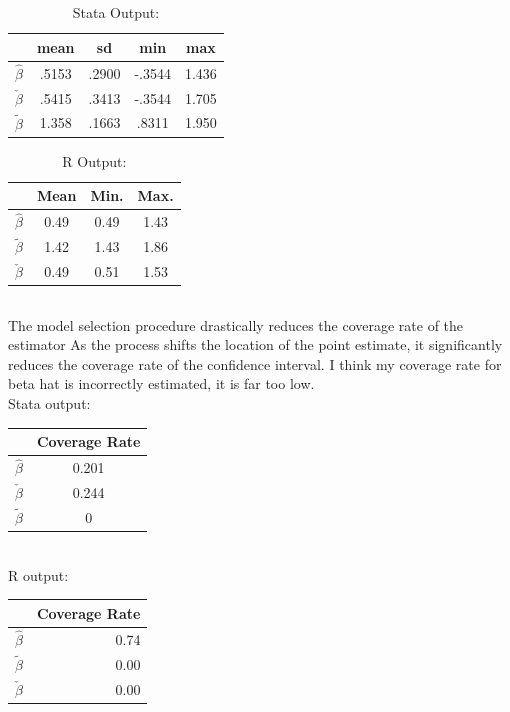 \documentclass[12pt]{article}
\begin{document}
\begin{table}[ht]
  \caption {Stata Output:} \label{tab:title}
\centering
\begin{tabular}{lcccc}
  \hline
&        mean&          sd&         min&         max\\
\hline
$\hat\beta$    &    .5153&    .2900&   -.3544&    1.436\\
$\check\beta$   &    .5415&    .3413&   -.3544&    1.705\\
$\tilde\beta$    &    1.358&    .1663&    .8311&    1.950\\
\hline
\end{tabular}
\end{table}

\par
\begin{table}[ht]
  \caption {R Output:} \label{tab:title}
\centering
\begin{tabular}{lccc}
  \hline
 & Mean & Min. & Max. \\
  \hline
$\hat\beta$   & 0.49 & 0.49 &  1.43 \\
  $\tilde\beta$   & 1.42 & 1.43 & 1.86 \\
 $\check\beta$  & 0.49 & 0.51 & 1.53 \\
   \hline
\end{tabular}
\end{table}

\subsection{}

The model selection procedure drastically reduces the coverage rate of the estimator As the process shifts the location of the point estimate, it significantly reduces the coverage rate of the confidence interval. I think my coverage rate for beta hat is incorrectly estimated, it is far too low. \\


Stata output:
\begin{tabular}{lc}
  \hline
&        Coverage Rate \\
\hline
$\hat\beta$    &    0.201 \\
$\check\beta$   &     0.244 \\
$\tilde\beta$    &   0 \\
\hline
\end{tabular}\\


R output:
\begin{tabular}{rr}
  \hline
 & Coverage Rate \\
  \hline
$\hat\beta$  & 0.74 \\
  $\tilde\beta$  & 0.00 \\
  $\check\beta$  & 0.00 \\
   \hline
\end{tabular}
\end{document}
